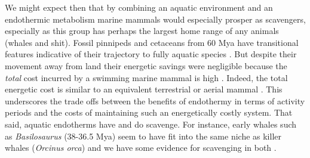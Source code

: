 \documentclass[a4paper,12pt]{article}
\begin{document}
We might expect then that by combining an aquatic environment and an endothermic metabolism marine mammals would especially prosper as scavengers, especially as this group has perhaps the largest home range of any animals (whales and shit).
Fossil pinnipeds and cetaceans from 60 Mya %
have transitional features indicative of their trajectory to fully aquatic species \citep{williams1999evolution}.  
But despite their movement away from land their energetic savings were negligible because the \textit{total} cost incurred by a swimming marine mammal is high \citep{williams1999evolution}. 
Indeed, the total energetic cost is similar to an equivalent terrestrial or aerial mammal \citep{williams1999evolution}.
This underscores the trade offs between the benefits of endothermy in terms of activity periods and the costs of maintaining such an energetically costly system. 
That said, aquatic endotherms have and do scavenge. 
For instance, early whales such as \textit{Basilosaurus} (38-36.5 Mya) seem to have fit into the same niche as killer whales (\textit{Orcinus orca}) and we have some evidence for scavenging in both \citep{fahlke2012bite,Whitehead415}.



\end{document}
